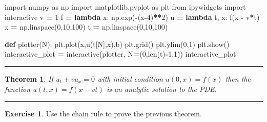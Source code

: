 \documentclass[
]{book}
\newenvironment{Shaded}{\begin{snugshade}}{\end{snugshade}}
\newcommand{\BuiltInTok}[1]{#1}
\newcommand{\DecValTok}[1]{\textcolor[rgb]{0.00,0.00,0.81}{#1}}
\newcommand{\ImportTok}[1]{#1}
\newcommand{\KeywordTok}[1]{\textcolor[rgb]{0.13,0.29,0.53}{\textbf{#1}}}
\newcommand{\NormalTok}[1]{#1}
\newcommand{\OperatorTok}[1]{\textcolor[rgb]{0.81,0.36,0.00}{\textbf{#1}}}
\newcommand{\StringTok}[1]{\textcolor[rgb]{0.31,0.60,0.02}{#1}}
\newtheorem{theorem}{Theorem}[chapter]
\theoremstyle{definition}
\theoremstyle{definition}
\theoremstyle{definition}
\newtheorem{exercise}{Exercise}[chapter]
\theoremstyle{remark}
\begin{document}
\begin{Shaded}
\begin{Highlighting}[]
\ImportTok{import}\NormalTok{ numpy }\ImportTok{as}\NormalTok{ np}
\ImportTok{import}\NormalTok{ matplotlib.pyplot }\ImportTok{as}\NormalTok{ plt}
\ImportTok{from}\NormalTok{ ipywidgets }\ImportTok{import}\NormalTok{ interactive }
\NormalTok{v }\OperatorTok{=} \DecValTok{1}
\NormalTok{f }\OperatorTok{=} \KeywordTok{lambda}\NormalTok{ x: np.exp(}\OperatorTok{{-}}\NormalTok{(x}\OperatorTok{{-}}\DecValTok{4}\NormalTok{)}\OperatorTok{**}\DecValTok{2}\NormalTok{)}
\NormalTok{u }\OperatorTok{=} \KeywordTok{lambda}\NormalTok{ t, x: f(x }\OperatorTok{{-}}\NormalTok{ v}\OperatorTok{*}\NormalTok{t)}
\NormalTok{x }\OperatorTok{=}\NormalTok{ np.linspace(}\DecValTok{0}\NormalTok{,}\DecValTok{10}\NormalTok{,}\DecValTok{100}\NormalTok{)}
\NormalTok{t }\OperatorTok{=}\NormalTok{ np.linspace(}\DecValTok{0}\NormalTok{,}\DecValTok{10}\NormalTok{,}\DecValTok{100}\NormalTok{)}

\KeywordTok{def}\NormalTok{ plotter(N):}
\NormalTok{  plt.plot(x,u(t[N],x),}\StringTok{\textquotesingle{}b\textquotesingle{}}\NormalTok{)}
\NormalTok{  plt.grid()}
\NormalTok{  plt.ylim(}\DecValTok{0}\NormalTok{,}\DecValTok{1}\NormalTok{)}
\NormalTok{  plt.show()}
\NormalTok{interactive\_plot }\OperatorTok{=}\NormalTok{ interactive(plotter, N}\OperatorTok{=}\NormalTok{(}\DecValTok{0}\NormalTok{,}\BuiltInTok{len}\NormalTok{(t)}\OperatorTok{{-}}\DecValTok{1}\NormalTok{,}\DecValTok{1}\NormalTok{))}
\NormalTok{interactive\_plot}
\end{Highlighting}
\end{Shaded}

\begin{center}\rule{0.5\linewidth}{0.5pt}\end{center}

\begin{theorem}
\protect\hypertarget{thm:unnamed-chunk-587}{}{\label{thm:unnamed-chunk-587} }If \(u_t + v u_{x} = 0\) with initial condition \(u(0,x) = f(x)\) then the function \(u(t,x) = f(x-vt)\) is an analytic solution to the PDE.
\end{theorem}

\begin{center}\rule{0.5\linewidth}{0.5pt}\end{center}

\begin{exercise}
\protect\hypertarget{exr:unnamed-chunk-588}{}{\label{exr:unnamed-chunk-588} }Use the chain rule to prove the previous theorem.
\end{exercise}
\end{document}
